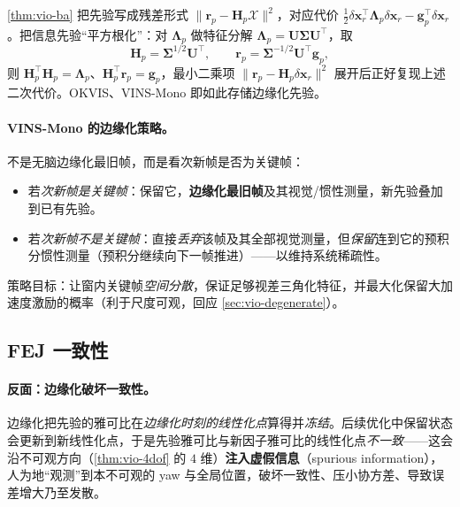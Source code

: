 \begin{derivation}[从信息矩阵到可塞进最小二乘的先验残差]
\cref{thm:vio-ba} 把先验写成残差形式 $\|\mathbf{r}_p-\mathbf{H}_p\mathcal{X}\|^2$，对应代价 $\tfrac12\delta\mathbf{x}_r^\top\boldsymbol{\Lambda}_p\delta\mathbf{x}_r-\mathbf{g}_p^\top\delta\mathbf{x}_r$。把信息先验“平方根化”：对 $\boldsymbol{\Lambda}_p$ 做特征分解 $\boldsymbol{\Lambda}_p=\mathbf{U}\boldsymbol{\Sigma}\mathbf{U}^\top$，取
\[
  \mathbf{H}_p=\boldsymbol{\Sigma}^{1/2}\mathbf{U}^\top,\qquad \mathbf{r}_p=\boldsymbol{\Sigma}^{-1/2}\mathbf{U}^\top\mathbf{g}_p,
\]
则 $\mathbf{H}_p^\top\mathbf{H}_p=\boldsymbol{\Lambda}_p$、$\mathbf{H}_p^\top\mathbf{r}_p=\mathbf{g}_p$，最小二乘项 $\|\mathbf{r}_p-\mathbf{H}_p\delta\mathbf{x}_r\|^2$ 展开后正好复现上述二次代价。OKVIS、VINS-Mono 即如此存储边缘化先验\cite{sibley2010sliding}。
\end{derivation}

\paragraph{VINS-Mono 的边缘化策略。}
不是无脑边缘化最旧帧，而是看次新帧是否为关键帧\cite{qin2018vins}：
\begin{itemize}
  \item 若\emph{次新帧是关键帧}：保留它，\textbf{边缘化最旧帧}及其视觉/惯性测量，新先验叠加到已有先验。
  \item 若\emph{次新帧不是关键帧}：直接\emph{丢弃}该帧及其全部视觉测量，但\emph{保留}连到它的预积分惯性测量（预积分继续向下一帧推进）——以维持系统稀疏性。
\end{itemize}
策略目标：让窗内关键帧\emph{空间分散}，保证足够视差三角化特征，并最大化保留大加速度激励的概率（利于尺度可观，回应 \cref{sec:vio-degenerate}）。

\subsection{FEJ 一致性}
\label{sec:vio-fej}

\paragraph{反面：边缘化破坏一致性。}
边缘化把先验的雅可比在\emph{边缘化时刻的线性化点}算得并\emph{冻结}。后续优化中保留状态会更新到新线性化点，于是先验雅可比与新因子雅可比的线性化点\emph{不一致}——这会沿不可观方向（\cref{thm:vio-4dof} 的 $4$ 维）\textbf{注入虚假信息}（spurious information），人为地“观测”到本不可观的 yaw 与全局位置，破坏一致性、压小协方差、导致误差增大乃至发散\cite{huang2019vins}。

